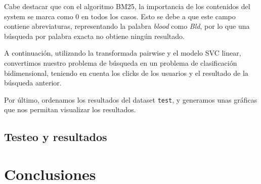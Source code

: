 \documentclass[a4paper,12pt]{article}
\begin{document}
	Cabe destacar que con el algoritmo BM25, la importancia de los contenidos del system se marca como 0 en todos los casos. Esto se debe a que este campo contiene abreviaturas, representando la palabra \textit{blood} como \textit{Bld}, por lo que una búsqueda por palabra exacta no obtiene ningún resultado.

	A continuación, utilizando la transformada pairwise y el modelo SVC linear, convertimos nuestro problema de búsqueda en un problema de clasificación bidimensional, teniendo en cuenta los clicks de los usuarios y el resultado de la búsqueda anterior. 
	
	Por último, ordenamos los resultados del dataset \texttt{test}, y generamos unas gráficas que nos permitan visualizar los resultados.
	
	\subsection{Testeo y resultados}
	
	
	
	\section{Conclusiones}
	

	
	
	
	
\end{document}
